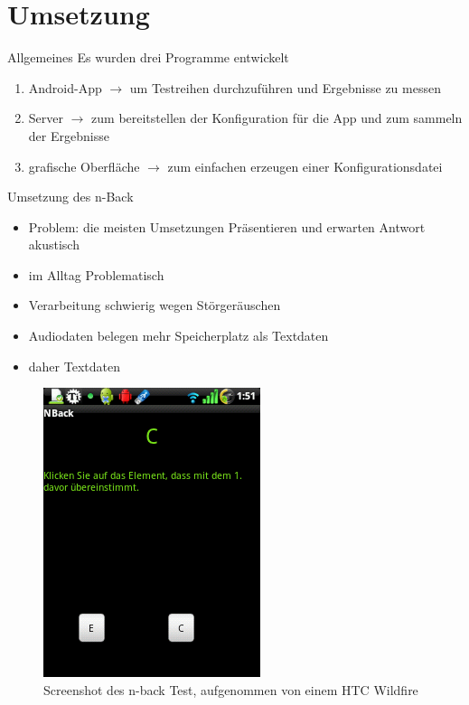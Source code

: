 \section{Umsetzung}

\begin{frame}{Allgemeines}
	Es wurden drei Programme entwickelt
	\pause
	\begin{enumerate}[<+->]
	\item Android-App $\rightarrow$ um Testreihen durchzuführen und Ergebnisse zu messen
	\item Server $\rightarrow$ zum bereitstellen der Konfiguration für die App und zum sammeln der Ergebnisse
	\item grafische Oberfläche $\rightarrow$ zum einfachen erzeugen einer Konfigurationsdatei
	\end{enumerate}
\end{frame}
\begin{frame}{Umsetzung des n-Back}
	\begin{itemize}[<+->]
	\item Problem: die meisten Umsetzungen Präsentieren und erwarten Antwort akustisch
	\item im Alltag Problematisch
	\item Verarbeitung schwierig wegen Störgeräuschen
	\item Audiodaten belegen mehr Speicherplatz als Textdaten
	\item daher Textdaten
	\end{itemize}
\end{frame}
\begin{frame}
	\begin{figure}[hbtp]
	\centering
	\includegraphics[width=0.4\linewidth]{pictures/screenshot-nback}
	\caption{Screenshot des n-back Test, aufgenommen von einem HTC Wildfire}
	\label{fig:sreen-nback}
	\end{figure}	
\end{frame}
